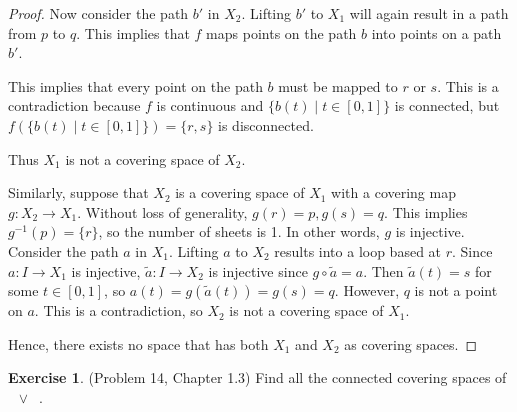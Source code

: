 \documentclass[12pt, psamsfonts]{amsart}
\theoremstyle{definition}
\newtheorem*{exer}{Exercise}
\theoremstyle{remark}
\DeclareMathOperator{\RP}{\mathbb{R}\mathbf{P}^2}
\numberwithin{equation}{section}
\begin{document}
\begin{proof}
  Now consider the path $b'$ in $X_2$.
  Lifting $b'$ to $X_1$ will again result in a path from $p$ to $q$.
  This implies that $f$ maps points on the path $b$ into points on a path $b'$.

  This implies that every point on the path $b$ must be mapped to $r$ or $s$.
  This is a contradiction because $f$ is continuous and $\{ b(t) \mid t \in [0, 1] \}$ is connected, but $f(\{ b(t) \mid t \in [0, 1] \}) = \{ r, s \}$ is disconnected.

  Thus $X_1$ is not a covering space of $X_2$.

  Similarly, suppose that $X_2$ is a covering space of $X_1$ with a covering map $g: X_2 \rightarrow X_1$.
  Without loss of generality, $g(r) = p, g(s) = q$.
  This implies $g^{-1}(p) = \{ r \}$, so the number of sheets is 1.
  In other words, $g$ is injective.
  Consider the path $a$ in $X_1$.
  Lifting $a$ to $X_2$ results into a loop based at $r$.
  Since $a: I \rightarrow X_1$ is injective, $\tilde{a}: I \rightarrow X_2$ is injective since $g \circ \tilde{a} = a$.
  Then $\tilde{a}(t) = s$ for some $t \in [0, 1]$, so $a(t) = g(\tilde{a}(t)) = g(s) = q$.
  However, $q$ is not a point on $a$.
  This is a contradiction, so $X_2$ is not a covering space of $X_1$.

  Hence, there exists no space that has both $X_1$ and $X_2$ as covering spaces.
\end{proof}

\begin{exer}{(Problem 14, Chapter 1.3)}
  Find all the connected covering spaces of $\RP \vee \RP$.
\end{exer}
\end{document}
